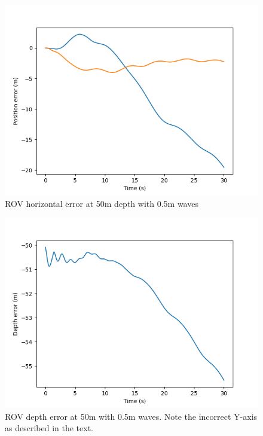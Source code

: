 \documentclass[class=article, crop=false]{standalone}
\begin{document}
\begin{figure}
    \centering
    \includegraphics{scenario1/rov-50m/0.5m/rov_position_error_uncontrolled}
    \caption{ROV horizontal error at 50m depth with 0.5m waves}
    \label{fig:rov_xy_error}
\end{figure}

\begin{figure}
    \centering
    \includegraphics{scenario1/rov-50m/0.5m/rov_depth_error_uncontrolled}
    \caption{ROV depth error at 50m with 0.5m waves. Note the incorrect Y-axis as described in the text.}
    \label{fig:rov_depth_error}
\end{figure}
\end{document}
